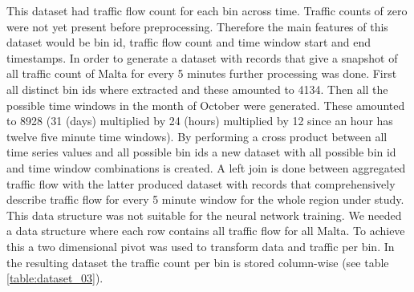\documentclass[12pt, a4paper]{report}
\theoremstyle{definition}
\theoremstyle{definition}%
\theoremstyle{definition}%
\theoremstyle{definition}%
\theoremstyle{definition}%
\theoremstyle{definition}%
\begin{document}
\begin{table}[h]	
	\centering
\caption{Traffic flow count by bin for every 5 minute window.} 
\label{table:dataset_02}
\end{table}


This dataset had traffic flow count for each bin across time. Traffic counts of zero were not yet present before preprocessing. Therefore the main features of this dataset would be bin id, traffic flow count and time window start and end timestamps. In order to generate a dataset with records that give a snapshot of all traffic count of Malta for every 5 minutes further processing was done. First all distinct bin ids where extracted and these amounted to 4134. Then all the possible time windows in the month of October were generated. These amounted to 8928 (31 (days) multiplied by 24 (hours)  multiplied by 12 since an hour has twelve five minute time windows). By performing a cross product between all time series values and all possible bin ids a new dataset with all possible bin id and time window combinations is created. A left join is done between aggregated traffic flow with the latter produced dataset with records that comprehensively describe traffic flow for every 5 minute window for the whole region under study. This data structure was not suitable for the neural network training. We needed a data structure where each row contains all traffic flow for all Malta. To achieve this a two dimensional pivot was used to transform data and traffic per bin. In the resulting dataset the traffic count per bin is stored column-wise (see table \ref{table:dataset_03}). 
\end{document}
